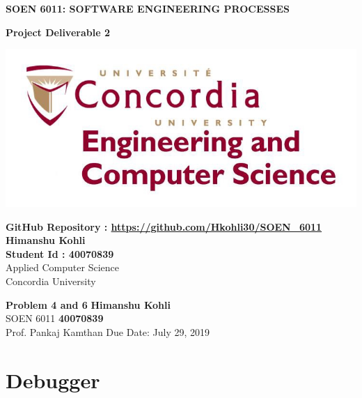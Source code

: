 \documentclass[a4paper, 11pt]{article}
\begin{document}
\begin{titlepage}
   \begin{center}
       \vspace*{1cm}
 
       \textbf{\huge{SOEN 6011: SOFTWARE ENGINEERING PROCESSES}}
 
       \vspace{0.5cm}
        \textbf{\huge{Project Deliverable 2}}
 
       \vspace{1.0cm}
       \vskip 1.4in
    \includegraphics[width=1.0\textwidth]{Concordia.jpg}
       
       \vskip 1.4in
 
       \vspace{0.8cm}
       \textbf{GitHub Repository : \url{https://github.com/Hkohli30/SOEN_6011}}\\
       
        \textbf{Himanshu Kohli}\\
        \textbf{Student Id : 40070839}\\
       Applied Computer Science\\
       Concordia University\\
       
 
   \end{center}
\end{titlepage}

\noindent
\large\textbf{Problem 4 and 6} \hfill \textbf{Himanshu Kohli} \\
\normalsize SOEN 6011 \hfill \textbf{40070839} \\
Prof. Pankaj Kamthan \hfill Due Date: July 29, 2019 \\


\section{Debugger}
\end{document}

